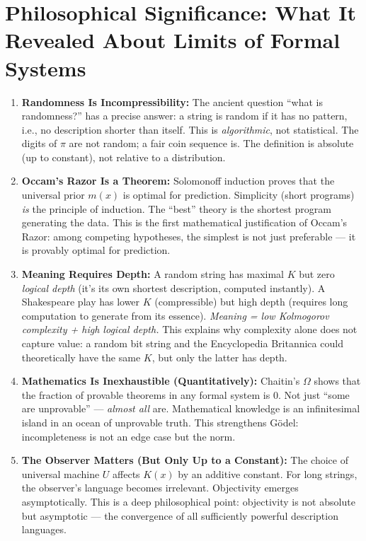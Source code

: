 \section{Philosophical Significance: What It Revealed About Limits of Formal Systems}
\label{sec:kolmogorov:philosophy}

\begin{enumerate}
\item \textbf{Randomness Is Incompressibility:} The ancient question ``what is randomness?'' has a precise answer: a string is random if it has no pattern, i.e., no description shorter than itself. This is \emph{algorithmic}, not statistical. The digits of $\pi$ are not random; a fair coin sequence is. The definition is absolute (up to constant), not relative to a distribution.

\item \textbf{Occam's Razor Is a Theorem:} Solomonoff induction proves that the universal prior $m(x)$ is optimal for prediction. Simplicity (short programs) \emph{is} the principle of induction. The ``best'' theory is the shortest program generating the data. This is the first mathematical justification of Occam's Razor: among competing hypotheses, the simplest is not just preferable --- it is provably optimal for prediction.

\item \textbf{Meaning Requires Depth:} A random string has maximal $K$ but zero \emph{logical depth} (it's its own shortest description, computed instantly). A Shakespeare play has lower $K$ (compressible) but high depth (requires long computation to generate from its essence). \emph{Meaning = low Kolmogorov complexity + high logical depth.} This explains why complexity alone does not capture value: a random bit string and the Encyclopedia Britannica could theoretically have the same $K$, but only the latter has depth.

\item \textbf{Mathematics Is Inexhaustible (Quantitatively):} Chaitin's $\Omega$ shows that the fraction of provable theorems in any formal system is 0. Not just ``some are unprovable'' --- \emph{almost all} are. Mathematical knowledge is an infinitesimal island in an ocean of unprovable truth. This strengthens G\"odel: incompleteness is not an edge case but the norm.

\item \textbf{The Observer Matters (But Only Up to a Constant):} The choice of universal machine $U$ affects $K(x)$ by an additive constant. For long strings, the observer's language becomes irrelevant. Objectivity emerges asymptotically. This is a deep philosophical point: objectivity is not absolute but asymptotic --- the convergence of all sufficiently powerful description languages.


\end{enumerate}
